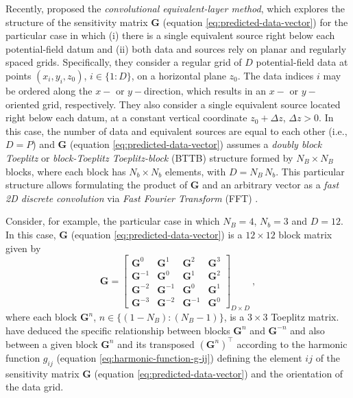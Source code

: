 Recently, \citet{takahashi-etal2020,takahashi-etal2022} proposed the \textit{convolutional equivalent-layer method}, 
which explores the structure of the sensitivity matrix $\mathbf{G}$ (equation \ref{eq:predicted-data-vector}) for 
the particular case in which (i) there is a single equivalent source right below each potential-field
datum and (ii) both data and sources rely on planar and regularly spaced grids.
Specifically, they consider a regular grid of $D$ 
potential-field data at points $(x_{i}, y_{i}, z_{0})$, $i \in \{1:D\}$, on a horizontal plane $z_{0}$.
The data indices $i$ may be ordered along the $x-$ or $y-$direction, which results in an
$x-$ or $y-$oriented grid, respectively.
They also consider a single equivalent source located right below each datum, at a constant vertical coordinate
$z_{0} + \Delta z$, $\Delta z > 0$.
In this case, the number of data and equivalent sources are equal to each other (i.e., $D = P$) and
$\mathbf{G}$ (equation \ref{eq:predicted-data-vector}) assumes a \textit{doubly block Toeplitz} \cite[][p. 28]{jain1989} or 
\textit{block-Toeplitz Toeplitz-block} (BTTB) \cite[][p. 67]{chan-jin2007} structure formed by $N_{B} \times N_{B}$
blocks, where each block has $N_{b} \times N_{b}$ elements, with $D = N_{B} \, N_{b}$.
This particular structure allows formulating the product
of $\mathbf{G}$ and an arbitrary vector as a \textit{fast 2D discrete convolution} via 
\textit{Fast Fourier Transform} (FFT) \cite[][section 4.2]{vanloan1992}.

Consider, for example, the particular case in which $N_{B} = 4$, $N_{b} = 3$ and $D = 12$. In this case,
$\mathbf{G}$ (equation \ref{eq:predicted-data-vector}) is a $12 \times 12$ block matrix given by
\begin{equation}
	\mathbf{G} = \begin{bmatrix}
		\mathbf{G}^{0} & \mathbf{G}^{1} & \mathbf{G}^{2} & \mathbf{G}^{3} \\
		\mathbf{G}^{-1} & \mathbf{G}^{0} & \mathbf{G}^{1} & \mathbf{G}^{2} \\
		\mathbf{G}^{-2} & \mathbf{G}^{-1} & \mathbf{G}^{0} & \mathbf{G}^{1} \\
		\mathbf{G}^{-3} & \mathbf{G}^{-2} & \mathbf{G}^{-1} & \mathbf{G}^{0}
	\end{bmatrix}_{D \times D} \: ,
	\label{eq:matrix-G-BTTB}
\end{equation}
where each block $\mathbf{G}^{n}$, $n \in \{ (1 - N_{B}) : (N_{B} - 1) \}$, is a $3 \times 3$ Toeplitz matrix.
\citet{takahashi-etal2020, takahashi-etal2022} have deduced the specific relationship between blocks $\mathbf{G}^{n}$
and $\mathbf{G}^{-n}$ and also between a given block $\mathbf{G}^{n}$ and its transposed $\left(\mathbf{G}^{n}\right)^{\top}$
according to the harmonic function $g_{ij}$ (equation \ref{eq:harmonic-function-g-ij}) defining the element $ij$ of
the sensitivity matrix $\mathbf{G}$ (equation \ref{eq:predicted-data-vector}) and the orientation of the data grid.

